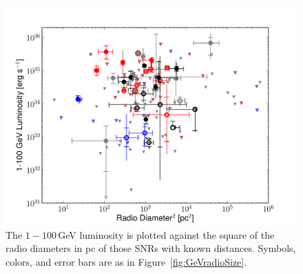 \begin{figure}[h]
	\centering
	\includegraphics[width=1.0\columnwidth]{figures/lum_vs_dia2.pdf}
	\caption[The $1-100$\,GeV luminosity vs. D$^2$ for SNRs with distance measurement.]{
		The $1-100$\,GeV luminosity is plotted against the square of the radio diameters in pc of those SNRs with known distances. Symbols, colors, and error bars are as in Figure~\ref{fig:GeVradioSize}.}
		\label{fig:LumDia}
\end{figure}

